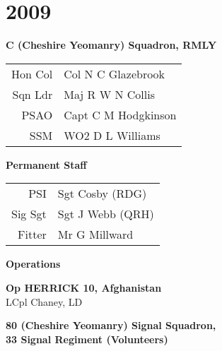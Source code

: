 \chapter*{2009}

\vspace*{10mm}

\begin{center}
  \Large
  \textbf{C (Cheshire Yeomanry) Squadron, RMLY}
\end{center}

\begin{center}
  \begin{tabular}{rl}
    Hon Col & Col N C Glazebrook \\
    Sqn Ldr & Maj R W N Collis \\
    PSAO & Capt C M Hodgkinson \\
    SSM & WO2 D L Williams \\
  \end{tabular}
\end{center}

\begin{center}
  \Large
  \textbf{Permanent Staff}
\end{center}

\begin{center}
  \begin{tabular}{rl}
    PSI & Sgt Cosby (RDG) \\
    Sig Sgt & Sgt J Webb (QRH) \\
    Fitter & Mr G Millward \\
  \end{tabular}
\end{center}

\begin{center}
  \Large
  \textbf{Operations}
\end{center}

\begin{center}
  \noindent
  \textbf{Op HERRICK 10, Afghanistan} \\
  LCpl Chaney, LD \\
\end{center}

\vspace*{10mm}

\begin{center}
  \Large
  \textbf{80 (Cheshire Yeomanry) Signal Squadron, \\ 33 Signal Regiment (Volunteers)}
\end{center}

